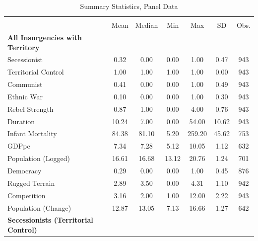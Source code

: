 \documentclass[12pt, letterpaper]{article}
\begin{document}
\let\cleardoublepage\clearpage
\begin{table}[htbp]
\def\sym#1{\ifmmode^{#1}\else\(^{#1}\)\fi}
\renewcommand\thetable{A.\Roman{table}}
\caption{Summary Statistics, Panel Data}
\begin{tabular}{l*{1}{cccccc}}
\hline\hline
                    &\multicolumn{6}{c}{}                                                         \\
                    &        Mean&         Median&         Min&         Max&          SD&       Obs.\\
\hline
\textbf{All Insurgencies with Territory} \\
Secessionist        &        0.32&        0.00&        0.00&        1.00&        0.47&         943\\
Territorial Control &        1.00&        1.00&        1.00&        1.00&        0.00&         943\\
Communist           &        0.41&        0.00&        0.00&        1.00&        0.49&         943\\
Ethnic War          &        0.10&        0.00&        0.00&        1.00&        0.30&         943\\
Rebel Strength      &        0.87&        1.00&        0.00&        4.00&        0.76&         943\\
Duration            &       10.24&        7.00&        0.00&       54.00&       10.62&         943\\
Infant Mortality    &       84.38&       81.10&        5.20&      259.20&       45.62&         753\\
GDPpc               &        7.34&        7.28&        5.12&       10.05&        1.12&         632\\
Population (Logged) &       16.61&       16.68&       13.12&       20.76&        1.24&         701\\
Democracy           &        0.29&        0.00&        0.00&        1.00&        0.45&         876\\
Rugged Terrain      &        2.89&        3.50&        0.00&        4.31&        1.10&         942\\
Competition         &        3.16&        2.00&        1.00&       12.00&        2.22&         943\\
Population (Change) &       12.87&       13.05&        7.13&       16.66&        1.27&         642\\
\hline
\textbf{Secessionists (Territorial Control)} \\

\end{tabular}
\end{table}
\end{document}
